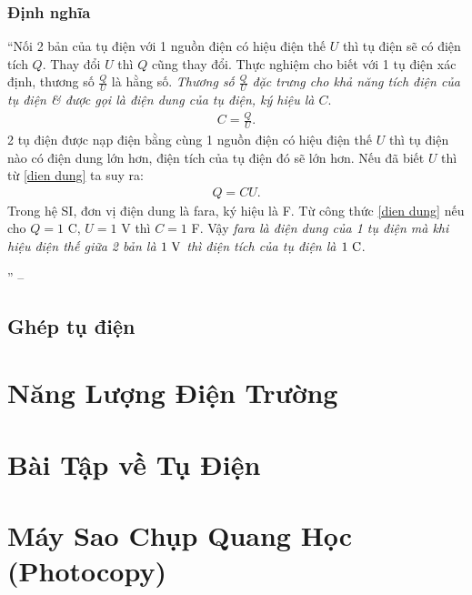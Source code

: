 \documentclass[oneside]{book}
\numberwithin{equation}{section}
\begin{document}
\subsubsection{Định nghĩa}
``Nối 2 bản của tụ điện với 1 nguồn điện có hiệu điện thế $U$ thì tụ điện sẽ có điện tích $Q$. Thay đổi $U$ thì $Q$ cũng thay đổi. Thực nghiệm cho biết với 1 tụ điện xác định, thương số $\frac{Q}{U}$ là hằng số. \textit{Thương số $\frac{Q}{U}$ đặc trưng cho khả năng tích điện của tụ điện \& được gọi là \emph{điện dung} của tụ điện, ký hiệu là $C$}.
\begin{align}
	\label{dien dung}
	C = \frac{Q}{U}.
\end{align}
2 tụ điện được nạp điện bằng cùng 1 nguồn điện có hiệu điện thế $U$ thì tụ điện nào có điện dung lớn hơn, điện tích của tụ điện đó sẽ lớn hơn. Nếu đã biết $U$ thì từ \eqref{dien dung} ta suy ra:
\begin{align}
	\label{dien dung 1}
	Q = CU.
\end{align}
Trong hệ SI, đơn vị điện dung là fara, ký hiệu là F. Từ công thức \eqref{dien dung} nếu cho $Q = 1$ C, $U = 1$ V thì $C = 1$ F. Vậy \textit{fara là điện dung của 1 tụ điện mà khi hiệu điện thế giữa 2 bản là $1\ {\rm V}$ thì điện tích của tụ điện là $1\ {\rm C}$}.

'' -- \cite[p. 33]{SGK_Vat_Ly_11_nang_cao}

\subsection{Ghép tụ điện}


\section{Năng Lượng Điện Trường}


\section{Bài Tập về Tụ Điện}


\section{Máy Sao Chụp Quang Học (Photocopy)}
\end{document}
